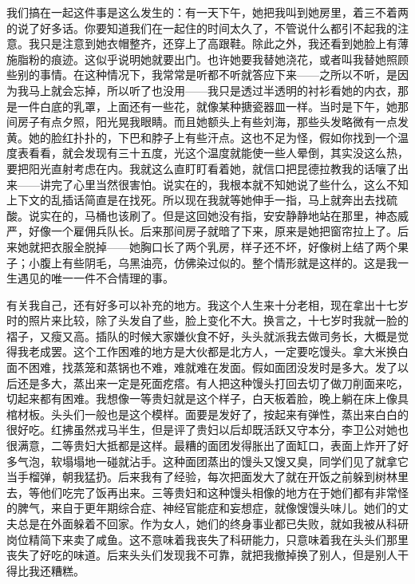 我们搞在一起这件事是这么发生的：有一天下午，她把我叫到她房里，着三不着两的说了好多话。你要知道我们在一起住的时间太久了，不管说什么都引不起我的注意。我只是注意到她衣帽整齐，还穿上了高跟鞋。除此之外，我还看到她脸上有薄施脂粉的痕迹。这似乎说明她就要出门。也许她要我替她浇花，或者叫我替她照顾些别的事情。在这种情况下，我常常是听都不听就答应下来——之所以不听，是因为我马上就会忘掉，所以听了也没用——我只是透过半透明的衬衫看她的内衣，那是一件白底的乳罩，上面还有一些花，就像某种搪瓷器皿一样。当时是下午，她那间房子有点夕照，阳光晃我眼睛。而且她额头上有些刘海，那些头发略微有一点发黄。她的脸红扑扑的，下巴和脖子上有些汗点。这也不足为怪，假如你找到一个温度表看看，就会发现有三十五度，光这个温度就能使一些人晕倒，其实没这么热，要把阳光直射考虑在内。我就这么直盯盯看着她，就信口把昆德拉教我的话嚷了出来——讲完了心里当然很害怕。说实在的，我根本就不知她说了些什么，这么不知上下文的乱插话简直是在找死。所以现在我就等她伸手一指，马上就奔出去找硫酸。说实在的，马桶也该刷了。但是这回她没有指，安安静静地站在那里，神态威严，好像一个雇佣兵队长。后来那间房子就暗了下来，原来是她把窗帘拉上了。后来她就把衣服全脱掉——她胸口长了两个乳房，样子还不坏，好像树上结了两个果子；小腹上有些阴毛，乌黑油亮，仿佛染过似的。整个情形就是这样的。这是我一生遇见的唯一一件不合情理的事。 

有关我自己，还有好多可以补充的地方。我这个人生来十分老相，现在拿出十七岁时的照片来比较，除了头发自了些，脸上变化不大。换言之，十七岁时我就一脸的褶子，又瘦又高。插队的时候大家嫌伙食不好，头头就派我去做司务长，大概是觉得我老成罢。这个工作困难的地方是大伙都是北方人，一定要吃馒头。拿大米换白面不困难，找蒸笼和蒸锅也不难，难就难在发面。假如面团没发时是多大。发了以后还是多大，蒸出来一定是死面疙瘩。有人把这种馒头打回去切了做刀削面来吃，切起来都有困难。我想像一等贵妇就是这个样子，白天板着脸，晚上躺在床上像具棺材板。头头们一般也是这个模样。面要是发好了，按起来有弹性，蒸出来白白的很好吃。红拂虽然戎马半生，但是评了贵妇以后却既活跃又守本分，李卫公对她也很满意，二等贵妇大抵都是这样。最糟的面团发得胀出了面缸口，表面上炸开了好多气泡，软塌塌地一碰就沾手。这种面团蒸出的馒头又馊又臭，同学们见了就拿它当手榴弹，朝我猛扔。后来我有了经验，每次把面发大了就在开饭之前躲到树林里去，等他们吃完了饭再出来。三等贵妇和这种馒头相像的地方在于她们都有非常怪的脾气，来自于更年期综合症、神经官能症和妄想症，就像馊馒头味儿。她们的丈夫总是在外面躲着不回家。作为女人，她们的终身事业都已失败，就如我被从科研岗位精简下来卖了咸鱼。这不意味着我丧失了科研能力，只意味着我在头头们那里丧失了好吃的味道。后来头头们发现我不可靠，就把我撤掉换了别人，但是别人干得比我还糟糕。 

